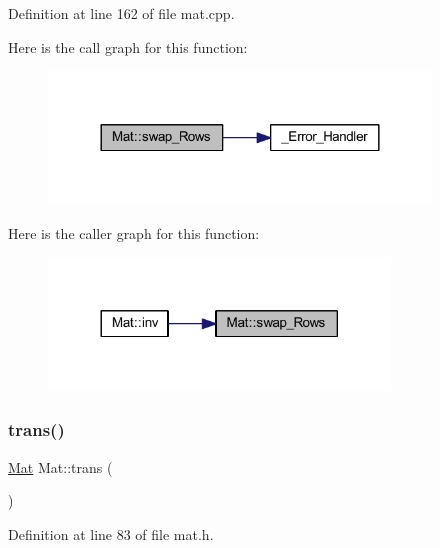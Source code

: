 Definition at line 162 of file mat.\+cpp.

Here is the call graph for this function\+:
\nopagebreak
\begin{figure}[H]
\begin{center}
\leavevmode
\includegraphics[width=288pt]{class_mat_a410c3755a4d91c1ef2bbe3fed93fbb00_cgraph}
\end{center}
\end{figure}
Here is the caller graph for this function\+:
\nopagebreak
\begin{figure}[H]
\begin{center}
\leavevmode
\includegraphics[width=257pt]{class_mat_a410c3755a4d91c1ef2bbe3fed93fbb00_icgraph}
\end{center}
\end{figure}
\mbox{\label{class_mat_aa2864c30e68caf29f400bb98295aa6a3}} 
\subsubsection{\texorpdfstring{trans()}{trans()}}
{\footnotesize\ttfamily \mbox{\hyperlink{class_mat}{Mat}} Mat\+::trans (\begin{DoxyParamCaption}{ }\end{DoxyParamCaption})\hspace{0.3cm}{\ttfamily [inline]}}



Definition at line 83 of file mat.\+h.

